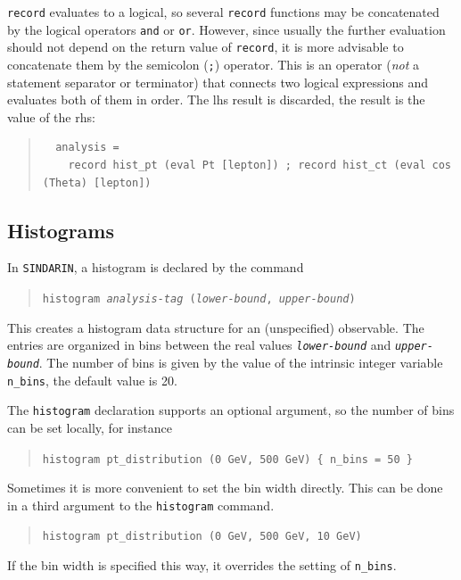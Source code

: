 \documentclass[12pt]{book}
\newcommand{\ttt}[1]{\texttt{#1}}
\newcommand{\sindarin}{\ttt{SINDARIN}}
\begin{document}
\ttt{record} evaluates to a logical, so several \ttt{record} functions may
be concatenated by the logical operators \ttt{and} or \ttt{or}.  However,
since usually the further evaluation should not depend on the return value of
\ttt{record}, it is more advisable to concatenate them by the semicolon
(\ttt{;}) operator.  This is an operator (\emph{not} a statement separator or
terminator) that connects two logical expressions and evaluates both of them
in order.  The lhs result is discarded, the result is the value of the rhs:
\begin{quote}
  \begin{footnotesize}
\begin{verbatim}
  analysis =
    record hist_pt (eval Pt [lepton]) ; record hist_ct (eval cos (Theta) [lepton])
\end{verbatim}
  \end{footnotesize}
\end{quote}


\subsection{Histograms}
\label{sec:histogram}

In \sindarin, a histogram is declared by the command
\begin{quote}
  \begin{footnotesize}
\ttt{histogram \emph{analysis-tag} (\emph{lower-bound}, \emph{upper-bound})}
  \end{footnotesize}
\end{quote}
This creates a histogram data structure for an (unspecified) observable.  The
entries are organized in bins between the real values \ttt{\emph{lower-bound}}
and \ttt{\emph{upper-bound}}.  The number of bins is given by the value of the
intrinsic integer variable \ttt{n\_bins}, the default value is 20.

The \ttt{histogram} declaration supports an optional argument, so the number
of bins can be set locally, for instance
\begin{quote}
  \begin{footnotesize}
\ttt{histogram pt\_distribution (0 GeV, 500 GeV) \{ n\_bins = 50 \}}
  \end{footnotesize}
\end{quote}
Sometimes it is more convenient to set the bin width directly.  This can be
done in a third argument to the \ttt{histogram} command.
\begin{quote}
  \begin{footnotesize}
\ttt{histogram pt\_distribution (0 GeV, 500 GeV, 10 GeV)}
  \end{footnotesize}
\end{quote}
If the bin width is specified this way, it overrides the setting of
\ttt{n\_bins}.
\end{document}
